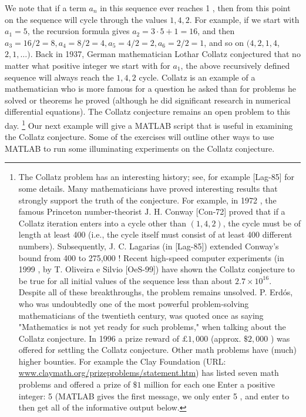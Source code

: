 \documentclass[../main.tex]{subfiles}
\begin{document}
We note that if a term $a_{n}$ in this sequence ever reaches 1 , then from this point on the sequence will cycle through the values $1,4,2$. For example, if we start with $a_{1}=5$, the recursion formula gives $a_{2}=3 \cdot 5+1=16$, and then $a_{3}=16 / 2=8, a_{4}=8 / 2=4, a_{5}=4 / 2=2, a_{6}=2 / 2=1$, and so on $(4,2,1,4$, $2,1, \ldots)$. Back in 1937, German mathematician Lothar Collatz conjectured that no matter what positive integer we start with for $a_{1}$, the above recursively defined sequence will always reach the $1,4,2$ cycle. Collatz is an example of a mathematician who is more famous for a question he asked than for problems he solved or theorems he proved (although he did significant research in numerical differential equations). The Collatz conjecture remains an open problem to this day. \footnote[2]{The Collatz problem has an interesting history; see, for example [Lag-85] for some details. Many mathematicians have proved interesting results that strongly support the truth of the conjecture. For example, in 1972 , the famous Princeton number-theorist $\mathrm{J}$. H. Conway [Con-72] proved that if a Collatz iteration enters into a cycle other than $(1,4,2)$, the cycle must be of length at least 400 (i.e., the cycle itself must consist of at least 400 different numbers). Subsequently, J. C. Lagarias (in [Lag-85]) extended Conway's bound from 400 to 275,000 ! Recent high-speed computer experiments (in 1999 , by T. Oliveira e Silvio [OeS-99]) have shown the Collatz conjecture to be true for all initial values of the sequence less than about $2.7 \times 10^{16}$. Despite all of these breakthroughs, the problem remains unsolved. P. Erdós, who was undoubtedly one of the most powerful problem-solving mathematicians of the twentieth century, was quoted once as saying "Mathematics is not yet ready for such problems," when talking about the Collatz conjecture. In 1996 a prize reward of $£ 1,000$ (approx. $\$ 2,000$ ) was offered for settling the Collatz conjecture. Other math problems have (much) higher bounties. For example the Clay Foundation (URL: \href{http://www.claymath.org/prizeproblems/statement.htm}{www.claymath.org/prizeproblems/statement.htm}) has listed seven math problems and offered a prize of $\$ 1$ million for each one Enter a positive integer: 5 (MATLAB gives the first message, we only enter 5 , and enter to then get all of the informative output below.} Our next example will give a MATLAB script that is useful in examining the Collatz conjecture. Some of the exercises will outline other ways to use MATLAB to run some illuminating experiments on the Collatz conjecture.\\
\end{document}
